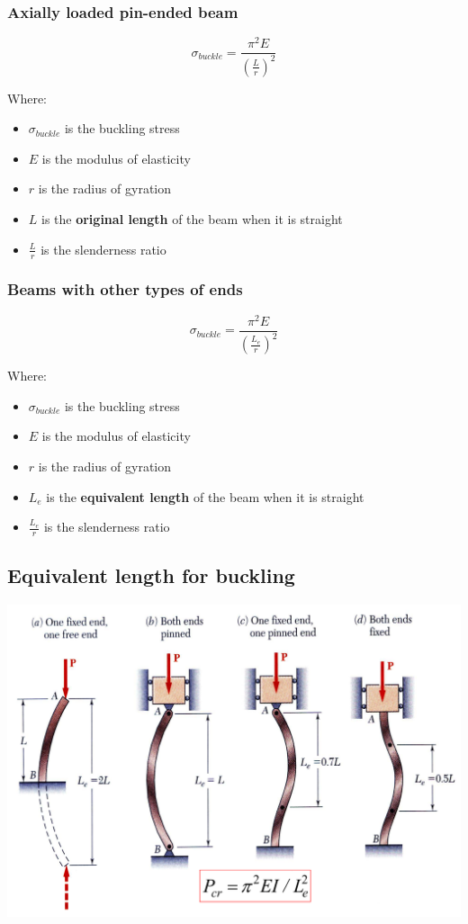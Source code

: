 \documentclass[11pt]{article}
\begin{document}
\subsubsection{Axially loaded pin-ended beam}
\label{sec:org38473ae}
\[\sigma_{buckle} = \frac{\pi^2 E}{\left( \frac{L}{r} \right)^2}\]

Where:
\begin{itemize}
\item \(\sigma_{buckle}\) is the buckling stress
\item \(E\) is the modulus of elasticity
\item \(r\) is the radius of gyration
\item \(L\) is the \textbf{original length} of the beam when it is straight
\item \(\frac{L}{r}\) is the slenderness ratio
\end{itemize}

\subsubsection{Beams with other types of ends}
\label{sec:org8216768}
\[\sigma_{buckle} = \frac{\pi^2 E}{\left( \frac{L_e}{r} \right)^2}\]

Where:
\begin{itemize}
\item \(\sigma_{buckle}\) is the buckling stress
\item \(E\) is the modulus of elasticity
\item \(r\) is the radius of gyration
\item \(L_e\) is the \textbf{equivalent length} of the beam when it is straight
\item \(\frac{L_e}{r}\) is the slenderness ratio
\end{itemize}

\subsection{Equivalent length for buckling}
\label{sec:org5fc8f4b}
\begin{center}
\includegraphics[width=.9\linewidth]{./images/beam-buckling.png}
\end{center}
\end{document}
